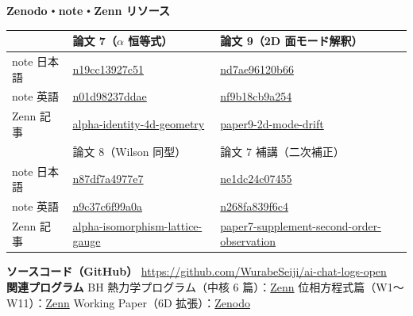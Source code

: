 \documentclass[9pt,a4paper]{ltjsarticle}
\begin{document}
\begin{center}
{\footnotesize\textbf{Zenodo・note・Zenn リソース}}
\end{center}

\vspace{1pt}
{\footnotesize
\begin{tabular}{@{}lll@{}}
\toprule
& 論文 7（$\alpha$ 恒等式） & 論文 9（2D 面モード解釈） \\
\midrule
note 日本語 & \href{https://note.com/kiharanoriaki/n/n19cc13927c51}{n19cc13927c51} & \href{https://note.com/kiharanoriaki/n/nd7ae96120b66}{nd7ae96120b66} \\
note 英語 & \href{https://note.com/kiharanoriaki/n/n01d98237ddae}{n01d98237ddae} & \href{https://note.com/kiharanoriaki/n/nf9b18cb9a254}{nf9b18cb9a254} \\
Zenn 記事 & \href{https://zenn.dev/noriaki_kihara/articles/alpha-identity-4d-geometry}{alpha-identity-4d-geometry} & \href{https://zenn.dev/noriaki_kihara/articles/paper9-2d-mode-drift}{paper9-2d-mode-drift} \\
\midrule
& 論文 8（Wilson 同型） & 論文 7 補講（二次補正） \\
\midrule
note 日本語 & \href{https://note.com/kiharanoriaki/n/n87df7a4977e7}{n87df7a4977e7} & \href{https://note.com/kiharanoriaki/n/ne1dc24c07455}{ne1dc24c07455} \\
note 英語 & \href{https://note.com/kiharanoriaki/n/n9c37c6f99a0a}{n9c37c6f99a0a} & \href{https://note.com/kiharanoriaki/n/n268fa839f6c4}{n268fa839f6c4} \\
Zenn 記事 & \href{https://zenn.dev/noriaki_kihara/articles/alpha-isomorphism-lattice-gauge}{alpha-isomorphism-lattice-gauge} & \href{https://zenn.dev/noriaki_kihara/articles/paper7-supplement-second-order-observation}{paper7-supplement-second-order-observation} \\
\bottomrule
\end{tabular}
}

\vspace{3pt}
{\footnotesize\textbf{ソースコード（GitHub）}\enspace
\url{https://github.com/WurabeSeiji/ai-chat-logs-open}\\[1pt]
\textbf{関連プログラム}\enspace
BH 熱力学プログラム（中核 6 篇）：\href{https://zenn.dev/noriaki_kihara/articles/bh-thermodynamics-projection}{Zenn}\enspace
位相方程式篇（W1〜W11）：\href{https://zenn.dev/noriaki_kihara/articles/phase-equation-hypercube-particle-classification}{Zenn}\enspace
Working Paper（6D 拡張）：\href{https://doi.org/10.5281/zenodo.19902677}{Zenodo}}
\end{document}
